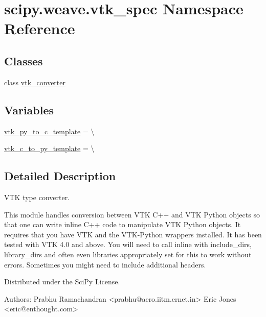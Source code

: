 \hypertarget{namespacescipy_1_1weave_1_1vtk__spec}{}\section{scipy.\+weave.\+vtk\+\_\+spec Namespace Reference}
\label{namespacescipy_1_1weave_1_1vtk__spec}
\subsection*{Classes}
\begin{DoxyCompactItemize}
\item 
class \hyperlink{classscipy_1_1weave_1_1vtk__spec_1_1vtk__converter}{vtk\+\_\+converter}
\end{DoxyCompactItemize}
\subsection*{Variables}
\begin{DoxyCompactItemize}
\item 
\hyperlink{namespacescipy_1_1weave_1_1vtk__spec_aa6f395e0e20238ea90596c4988828b50}{vtk\+\_\+py\+\_\+to\+\_\+c\+\_\+template} = \textbackslash{}
\item 
\hyperlink{namespacescipy_1_1weave_1_1vtk__spec_aeb01d387822813b60b1785226ce4bb98}{vtk\+\_\+c\+\_\+to\+\_\+py\+\_\+template} = \textbackslash{}
\end{DoxyCompactItemize}


\subsection{Detailed Description}
\begin{DoxyVerb}VTK type converter.

This module handles conversion between VTK C++ and VTK Python objects
so that one can write inline C++ code to manipulate VTK Python
objects.  It requires that you have VTK and the VTK-Python wrappers
installed.  It has been tested with VTK 4.0 and above.  You will need
to call inline with include_dirs, library_dirs and often even
libraries appropriately set for this to work without errors.
Sometimes you might need to include additional headers.

Distributed under the SciPy License.

Authors:
  Prabhu Ramachandran <prabhu@aero.iitm.ernet.in>
  Eric Jones <eric@enthought.com>
\end{DoxyVerb}
 

